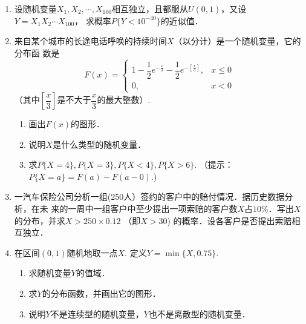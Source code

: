\documentclass[10pt,a4paper]{article}
\begin{document}
\begin{enumerate}
    \item 设随机变量$X_1,X_2,\cdots,X_{100}$相互独立，且都服从$U(0,1)$，又设$Y=X_1X_2 \cdots X_{100}$，
    求概率$P\{Y<10^{-40}\}$的近似值．



    \item 来自某个城市的长途电话呼唤的持续时间$X$（以分计）是一个随机变量，它的分布函
    数是
    $$F(x)=\left\{\begin{array}{ll}
        1-\dfrac{1}{2}e^{-\frac{x}{3}}-\dfrac{1}{2}e^{-[\frac{x}{3}]}, & x\leq 0\\
        0, & x<0
    \end{array}\right.$$
    （其中$[\dfrac{x}{3}]$是不大于$\dfrac{x}{3}$的最大整数）.
    \begin{enumerate}
        \item 画出$F(x)$的图形．
        \item 说明$X$是什么类型的随机变量．
        \item 求$P\{X=4\},P\{X=3\},P\{X<4\},P\{X>6\}$. （提示：$P\{X=a\}=F(a)-F(a-0)$.)
    \end{enumerate}




    \item 一汽车保险公司分析一组(250人）签约的客户中的赔付情况．据历史数据分析，在未
    来的一周中一组客户中至少提出一项索赔的客户数$X$占$10\%$．写出$X$的分布，并求$X>250\times 0.12$
   （即$X>30$) 的概率．设各客户是否提出索赔相互独立．



   \item 在区间$(0,1)$随机地取一点$X$. 定义$Y=\min \{X,0.75\}$.
   \begin{enumerate}
       \item 求随机变量$Y$的值域．
       \item 求$Y$的分布函数，并画出它的图形．
       \item 说明$Y$不是连续型的随机变量，$Y$也不是离散型的随机变量．
   \end{enumerate}

    

    

  

\end{enumerate}
\end{document}
